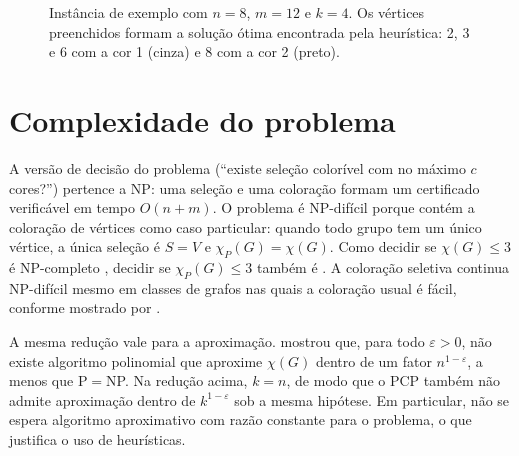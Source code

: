 \documentclass[12pt]{article}
\newcommand{\chiP}{\chi_P}
\begin{document}
\begin{figure}[ht]
  \centering
  \caption{Instância de exemplo com $n=8$, $m=12$ e $k=4$. Os vértices
    preenchidos formam a solução ótima encontrada pela heurística: 2, 3 e 6 com
    a cor 1 (cinza) e 8 com a cor 2 (preto).}
  \label{fig:toy}
\end{figure}

\section{Complexidade do problema}\label{sec:complexidade}

A versão de decisão do problema (``existe seleção colorível com no máximo $c$
cores?'') pertence a NP: uma seleção e uma coloração formam um certificado
verificável em tempo $O(n+m)$. O problema é NP-difícil porque contém a coloração
de vértices como caso particular: quando todo grupo tem um único vértice, a
única seleção é $S=V$ e $\chiP(G)=\chi(G)$. Como decidir se $\chi(G)\le 3$ é
NP-completo \cite{karp1972,garey1979}, decidir se $\chiP(G)\le 3$ também é
\cite{li2000}. A coloração seletiva continua NP-difícil mesmo em classes de
grafos nas quais a coloração usual é fácil, conforme mostrado por
\cite{demange2014}.

A mesma redução vale para a aproximação. \cite{zuckerman2007} mostrou que, para
todo $\varepsilon>0$, não existe algoritmo polinomial que aproxime $\chi(G)$
dentro de um fator $n^{1-\varepsilon}$, a menos que P${}={}$NP. Na redução
acima, $k=n$, de modo que o PCP também não admite aproximação dentro de
$k^{1-\varepsilon}$ sob a mesma hipótese. Em particular, não se espera algoritmo
aproximativo com razão constante para o problema, o que justifica o uso de
heurísticas.
\end{document}

